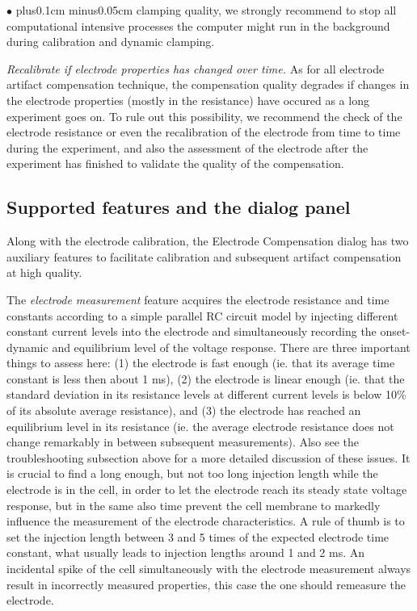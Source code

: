 \documentclass{article}
\newenvironment{myitem}{\begin{list}{$\bullet$}{\setlength{\leftmargin}{1.1em}
\itemsep0.1cm plus0.1cm minus0.05cm
\listparindent0cm
\addtolength{\labelsep}{0.5\labelsep}
\setlength{\labelwidth}{0.8em}
\setlength{\leftmargin}{\labelwidth}
\addtolength{\leftmargin}{\labelsep}
}}{\end{list}}
\begin{document}
\begin{myitem}
  clamping quality, we strongly recommend to stop
  all computational intensive processes the computer might run in the
  background during calibration and dynamic clamping.
\item \emph{Recalibrate if electrode properties has changed over time.} As
  for all electrode artifact compensation technique, the compensation quality
  degrades if changes in the electrode properties (mostly in the
  resistance) have occured as a long experiment goes on. To rule out this
  possibility, we recommend the check of the electrode resistance or even
  the recalibration of the electrode from time to time during the
  experiment, and also the assessment of the electrode after the
  experiment has finished to validate the quality of the compensation. 
\end{myitem}

\subsection{Supported features and the dialog panel}

Along with the electrode calibration, the Electrode Compensation dialog has
two auxiliary features to facilitate calibration and subsequent
artifact compensation at high quality. 

The \emph{electrode measurement} feature acquires the electrode resistance
and time constants according to a simple parallel RC circuit model by
injecting different constant current levels into the electrode and
simultaneously recording the onset-dynamic and equilibrium level of the
voltage response. There are three important things to assess here: (1) the
electrode is fast enough (ie. that its average time constant is less then
about 1 ms), (2) the electrode is linear enough (ie. that the standard
deviation in its resistance levels at different current levels is below
10\% of its absolute average resistance), and (3) the electrode has reached
an equilibrium level in its resistance (ie. the average electrode
resistance does not change remarkably in between subsequent
measurements). Also see the troubleshooting subsection above for a more
detailed discussion of these issues. It is crucial to find a long enough,
but not too long injection length while the electrode is in the cell, in
order to let the electrode reach its steady state voltage response, but in
the same also time prevent the cell membrane to markedly influence the
measurement of the electrode characteristics. A rule of thumb is to set the
injection length between 3 and 5 times of the expected electrode time
constant, what usually leads to injection lengths around 1 and 2 ms. An
incidental spike of the cell simultaneously with the electrode measurement
always result in incorrectly measured properties, this case the one should
remeasure the electrode. 
\end{document}
